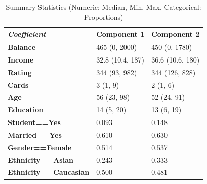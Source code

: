 \documentclass[12pt]{article}
\begin{document}
{\begin{table}[H] \centering 
  \caption{Summary Statistics (Numeric: Median, Min, Max, Categorical: Proportions)} 
  \label{} 
\begin{tabular}{l|ll}
\hline
\textit{\textbf{Coefficient}} & \textbf{Component 1} & \textbf{Component 2} \\
\hline
\textbf{Balance} & 465 (0, 2000) & 450 (0, 1780) \\
\textbf{Income} & 32.8 (10.4, 187) & 36.6 (10.6, 180) \\
\textbf{Rating} & 344 (93, 982) & 344 (126, 828) \\
\textbf{Cards} & 3 (1, 9) & 2 (1, 6) \\
\textbf{Age} & 56 (23, 98) & 52 (24, 91) \\
\textbf{Education} & 14 (5, 20) & 13 (6, 19) \\
\textbf{Student==Yes} & 0.093 & 0.148 \\
\textbf{Married==Yes} & 0.610 & 0.630 \\
\textbf{Gender==Female} & 0.514 & 0.537 \\
\textbf{Ethnicity==Asian} & 0.243 & 0.333 \\
\textbf{Ethnicity==Caucasian} & 0.500 & 0.481
\end{tabular}
\end{table}

}
\end{document}

